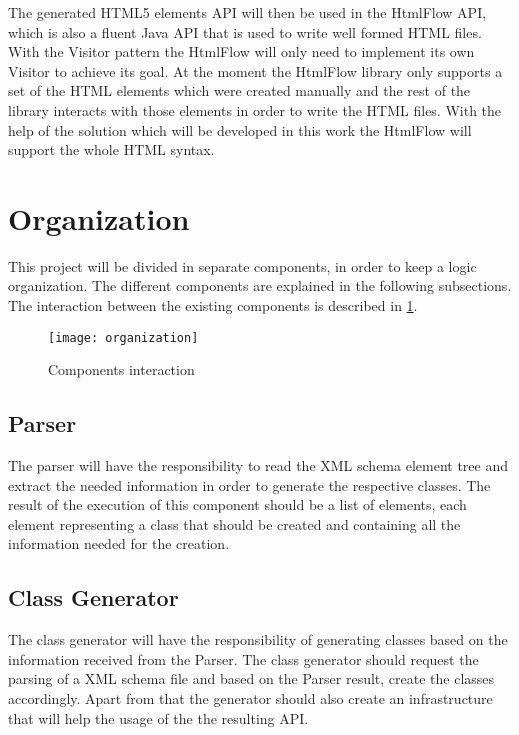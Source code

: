 \noindent
The generated HTML5 elements API will then be used in the HtmlFlow API, which is also a fluent Java API that is used to write well formed HTML files. With the Visitor pattern the HtmlFlow will only need to implement its own Visitor to achieve its goal. At the moment the HtmlFlow library only supports a set of the HTML elements which were created manually and the rest of the library interacts with those elements in order to write the HTML files. With the help of the solution which will be developed in this work the HtmlFlow will support the whole HTML syntax. 

\newpage

\section{Organization}

This project will be divided in separate components, in order to keep a logic organization. The different components are explained in the following subsections. The interaction between the existing components is described in \ref{ComponentInteraction}.

\begin{figure}[ht]
	\centering
	\texttt{[image: organization]}
	\caption{Components interaction}
	\label{ComponentInteraction}
\end{figure}

\subsection{Parser}

The parser will have the responsibility to read the XML schema element tree and extract the needed information in order to generate the respective classes. The result of the execution of this component should be a list of elements, each element representing a class that should be created and containing all the information needed for the creation.

\subsection{Class Generator}

The class generator will have the responsibility of generating classes based on the information received from the Parser. The class generator should request the parsing of a XML schema file and based on the Parser result, create the classes accordingly. Apart from that the generator should also create an infrastructure that will help the usage of the the resulting API. 

